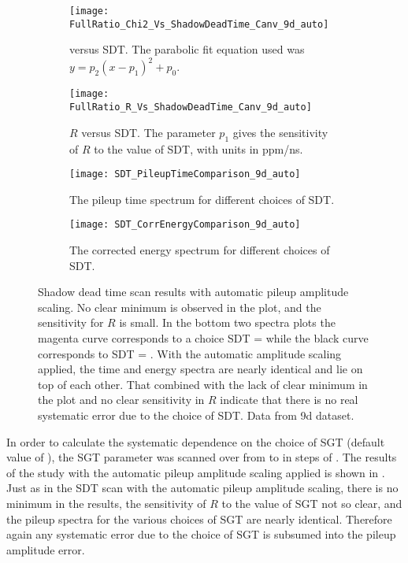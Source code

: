 \begin{figure}[]
\centering
    \begin{subfigure}[t]{0.45\textwidth}
        \centering
        \texttt{[image: FullRatio\_Chi2\_Vs\_ShadowDeadTime\_Canv\_9d\_auto]}
        \caption{\chisq versus SDT. The parabolic fit equation used was $y = p_{2}(x - p_{1})^{2} + p_{0}.$}
    \end{subfigure}%
    \hspace{1cm}
    \begin{subfigure}[t]{0.45\textwidth}
        \centering
        \texttt{[image: FullRatio\_R\_Vs\_ShadowDeadTime\_Canv\_9d\_auto]}
        \caption{$R$ versus SDT. The parameter $p_{1}$ gives the sensitivity of $R$ to the value of SDT, with units in ppm/ns.}
    \end{subfigure}

    \begin{subfigure}[t]{0.45\textwidth}
        \centering
        \texttt{[image: SDT\_PileupTimeComparison\_9d\_auto]}
        \caption{The pileup time spectrum for different choices of SDT.}
    \end{subfigure}%
    \hspace{1cm}
    \begin{subfigure}[t]{0.45\textwidth}
        \centering
        \texttt{[image: SDT\_CorrEnergyComparison\_9d\_auto]}
        \caption{The corrected energy spectrum for different choices of SDT.}
    \end{subfigure}
\caption[Pileup shadow dead time scan with automatic pileup amplitude scaling]{Shadow dead time scan results with automatic pileup amplitude scaling. No clear minimum is observed in the \chisq plot, and the sensitivity for $R$ is small. In the bottom two spectra plots the magenta curve corresponds to a choice SDT =  while the black curve corresponds to SDT = . With the automatic amplitude scaling applied, the time and energy spectra are nearly identical and lie on top of each other. That combined with the lack of clear minimum in the \chisq plot and no clear sensitivity in $R$ indicate that there is no real systematic error due to the choice of SDT. Data from 9d dataset.}
\label{fig:SDTscan_autoScaling}
\end{figure}


In order to calculate the systematic dependence on the choice of SGT (default value of ), the SGT parameter was scanned over from  to  in steps of . The results of the study with the automatic pileup amplitude scaling applied is shown in . Just as in the SDT scan with the automatic pileup amplitude scaling, there is no minimum in the \chisq results, the sensitivity of $R$ to the value of SGT not so clear, and the pileup spectra for the various choices of SGT are nearly identical. Therefore again any systematic error due to the choice of SGT is subsumed into the pileup amplitude error.


